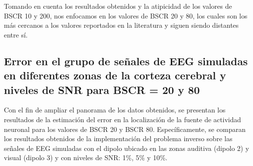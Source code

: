 Tomando en cuenta los resultados obtenidos y la atipicidad de los valores de BSCR 10 y 200, nos enfocamos en los valores de BSCR 20 y 80, los cuales son los más cercanos a los valores reportados en la literatura y siguen siendo distantes entre sí. 


\subsection{Error en el grupo de señales de EEG simuladas en diferentes zonas de la corteza cerebral y niveles de SNR para BSCR = 20 y 80}
\label{sec:results:error:dn-rest}



Con el fin de ampliar el panorama de los datos obtenidos, se presentan los resultados de la estimación del error en la localización de la fuente de actividad neuronal para los valores de BSCR 20 y BSCR 80.
Específicamente, se comparan los resultados obtenidos de la implementación del problema inverso sobre las señales de EEG simuladas con el dipolo ubicado en las zonas auditiva (dipolo 2) y visual (dipolo 3) y con niveles de SNR: 1\%, 5\% y 10\%.

